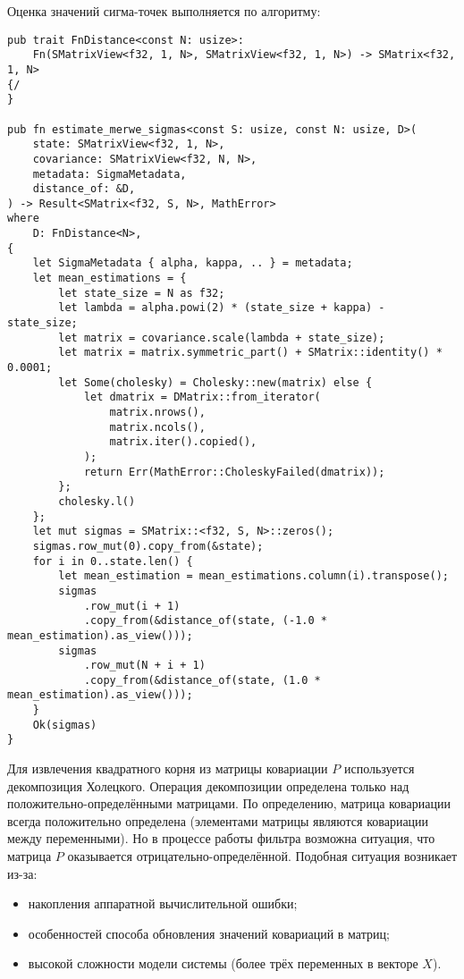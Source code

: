 Оценка значений сигма-точек выполняется по алгоритму:
\begin{lstlisting}
pub trait FnDistance<const N: usize>:
    Fn(SMatrixView<f32, 1, N>, SMatrixView<f32, 1, N>) -> SMatrix<f32, 1, N>
{/
}

pub fn estimate_merwe_sigmas<const S: usize, const N: usize, D>(
    state: SMatrixView<f32, 1, N>,
    covariance: SMatrixView<f32, N, N>,
    metadata: SigmaMetadata,
    distance_of: &D,
) -> Result<SMatrix<f32, S, N>, MathError>
where
    D: FnDistance<N>,
{
    let SigmaMetadata { alpha, kappa, .. } = metadata;
    let mean_estimations = {
        let state_size = N as f32;
        let lambda = alpha.powi(2) * (state_size + kappa) - state_size;
        let matrix = covariance.scale(lambda + state_size);
        let matrix = matrix.symmetric_part() + SMatrix::identity() * 0.0001;
        let Some(cholesky) = Cholesky::new(matrix) else {
            let dmatrix = DMatrix::from_iterator(
                matrix.nrows(),
                matrix.ncols(),
                matrix.iter().copied(),
            );
            return Err(MathError::CholeskyFailed(dmatrix));
        };
        cholesky.l()
    };
    let mut sigmas = SMatrix::<f32, S, N>::zeros();
    sigmas.row_mut(0).copy_from(&state);
    for i in 0..state.len() {
        let mean_estimation = mean_estimations.column(i).transpose();
        sigmas
            .row_mut(i + 1)
            .copy_from(&distance_of(state, (-1.0 * mean_estimation).as_view()));
        sigmas
            .row_mut(N + i + 1)
            .copy_from(&distance_of(state, (1.0 * mean_estimation).as_view()));
    }
    Ok(sigmas)
}

\end{lstlisting}

Для извлечения квадратного корня из матрицы ковариации $P$ используется
декомпозиция Холецкого. Операция декомпозиции определена только над
положительно\hyp{}определёнными матрицами. По определению, матрица ковариации всегда
положительно определена (элементами матрицы являются ковариации между
переменными). Но в процессе работы фильтра возможна ситуация, что матрица $P$
оказывается отрицательно-определённой.
Подобная ситуация возникает из-за:
\begin{itemize}
    \item накопления аппаратной вычислительной ошибки;
    \item особенностей способа обновления значений ковариаций в матриц;
    \item высокой сложности модели системы (более трёх переменных в векторе $X$).
\end{itemize}


